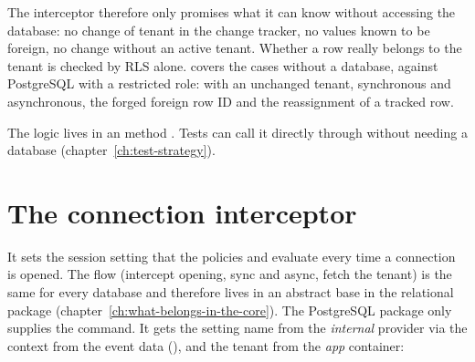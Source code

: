 The interceptor therefore only promises what it can know without accessing the database: no
change of tenant in the change tracker, no values known to be foreign, no change without an
active tenant. Whether a row really belongs to the tenant is checked by RLS alone.
 covers the cases
without a database,  against PostgreSQL with
a restricted role:  with an unchanged tenant, synchronous and asynchronous, the
forged foreign row ID and the reassignment of a tracked row.

The logic lives in an  method . Tests can call
it directly through  without needing a
database (chapter~\ref{ch:test-strategy}).

\section{The connection interceptor}

It sets the session setting that the policies and
 evaluate every time a connection is opened.
The flow (intercept opening, sync and async, fetch the tenant) is the same for every
database and therefore lives in an abstract base in the relational package
(chapter~\ref{ch:what-belongs-in-the-core}). The PostgreSQL package only supplies the
command. It gets the setting name from the \emph{internal} provider via the context from the
event data
(), and
the tenant from the \emph{app} container:

